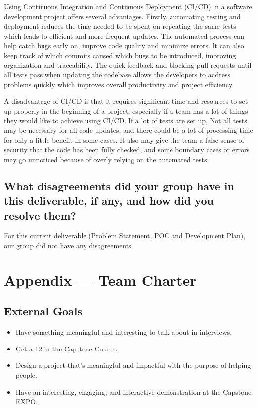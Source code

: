 \documentclass{article}
\begin{document}
Using Continuous Integration and Continuous Deployment (CI/CD) in a software development project offers several 
advantages. Firstly, automating testing and deployment reduces the time needed to be spent on repeating the same tests which
leads to efficient and more frequent updates. The automated process can help catch bugs early on, improve code quality 
and minimize errors. It can also keep track of which commits caused which bugs to be introduced, improving organization
and traceability. The quick feedback and blocking pull requests until all tests pass when updating the codebase allows 
the developers to address problems quickly which improves overall productivity and project efficiency.

A disadvantage of CI/CD is that it requires significant time and resources to set up properly in the beginning of a 
project, especially if a team has a lot of things they would like to achieve using CI/CD. If a lot of tests are set up, 
Not all tests may be necessary for all code updates, and there could be a lot of processing time for only a little 
benefit in some cases. It also may give the team a false sense of security that the code has been fully checked, 
and some boundary cases or errors may go unnoticed because of overly relying on the automated tests. 

\subsection*{What disagreements did your group have in this deliverable, if any, and how did you resolve them?}

For this current deliverable (Problem Statement, POC and Development Plan), our group did not have any disagreements.

\newpage{}

\section*{Appendix --- Team Charter}

\subsection*{External Goals}

\begin{itemize}
\item Have something meaningful and interesting to talk about in interviews.
\item Get a 12 in the Capstone Course.
\item Design a project that's meaningful and impactful with the purpose of helping people.
\item Have an interesting, engaging, and interactive demonstration at the Capstone EXPO.
\end{itemize}
\end{document}
